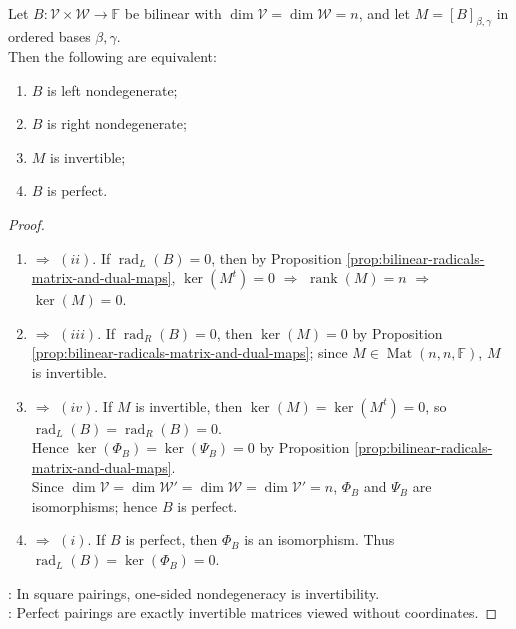 \begin{proposition} \label{prop:square-bilinear-pairing-equivalences} \\
Let $B:\mathcal{V}\times\mathcal{W}\to\mathbb{F}$ be bilinear with $\dim\mathcal{V}=\dim\mathcal{W}=n$, and let $M=[B]_{\beta,\gamma}$ in ordered bases $\beta,\gamma$.\\
Then the following are equivalent:
\begin{enumerate}[label=(\roman*)]
\setlength{\itemsep}{0pt}
\item $B$ is left nondegenerate;
\item $B$ is right nondegenerate;
\item $M$ is invertible;
\item $B$ is perfect.
\end{enumerate}
\begin{proof}
\begin{enumerate}[label=(\roman*).]
\setlength{\itemsep}{0pt}
\item[$(i)$] $\Rightarrow$ $(ii)$. If $\operatorname{rad}_{L}(B)=0$, then by Proposition \ref{prop:bilinear-radicals-matrix-and-dual-maps}, $\ker(M^t)=0$ $\Rightarrow$ $\operatorname{rank}(M)=n$ $\Rightarrow$ $\ker(M)=0$.
\item[$(ii)$] $\Rightarrow$ $(iii)$. If $\operatorname{rad}_{R}(B)=0$, then $\ker(M)=0$ by Proposition \ref{prop:bilinear-radicals-matrix-and-dual-maps}; since $M\in\operatorname{Mat}(n,n,\mathbb{F})$, $M$ is invertible.
\item[$(iii)$] $\Rightarrow$ $(iv)$. If $M$ is invertible, then $\ker(M)=\ker(M^t)=0$, so $\operatorname{rad}_{L}(B)=\operatorname{rad}_{R}(B)=0$.\\
Hence $\ker(\Phi_B)=\ker(\Psi_B)=0$ by Proposition \ref{prop:bilinear-radicals-matrix-and-dual-maps}.\\
Since $\dim\mathcal{V}=\dim\mathcal{W}'=\dim\mathcal{W}=\dim\mathcal{V}'=n$, $\Phi_B$ and $\Psi_B$ are isomorphisms; hence $B$ is perfect.
\item[$(iv)$] $\Rightarrow$ $(i)$. If $B$ is perfect, then $\Phi_B$ is an isomorphism. Thus $\operatorname{rad}_{L}(B)=\ker(\Phi_B)=0$.
\end{enumerate}
: In square pairings, one-sided nondegeneracy is invertibility.\\
: Perfect pairings are exactly invertible matrices viewed without coordinates.
\end{proof}
\end{proposition}

